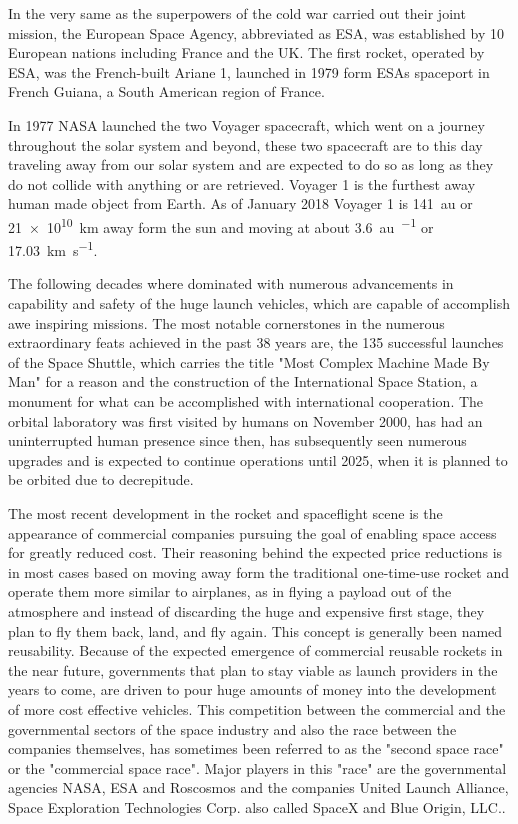 In the very same as the superpowers of the cold war carried out their joint mission, the European Space Agency, abbreviated as ESA, was established by 10 European nations including France and the UK. The first rocket, operated by ESA, was the French-built Ariane 1, launched in 1979 form ESAs spaceport in French Guiana, a South American region of France.

In 1977 NASA launched the two Voyager spacecraft, which went on a journey throughout the solar system and beyond, these two spacecraft are to this day traveling away from our solar system and are expected to do so as long as they do not collide with anything or are retrieved. Voyager 1 is the furthest away human made object from Earth. As of January 2018 Voyager 1 is \SI{141}{\astronomicalunit} or \SI{21e10}{\kilo\meter} away form the sun and moving at about \SI{3.6}{\astronomicalunit\per\year} or \SI{17.03}{\kilo\meter\per\second}.

The following decades where dominated with numerous advancements in capability and safety of the huge launch vehicles, which are capable of accomplish awe inspiring missions. The most notable cornerstones in the numerous extraordinary feats achieved in the past 38 years are, the 135 successful launches of the Space Shuttle, which carries the title "Most Complex Machine Made By Man" for a reason and the construction of the International Space Station, a monument for what can be accomplished with international cooperation. The orbital laboratory was first visited by humans on November 2000, has had an uninterrupted human presence since then, has subsequently seen numerous upgrades and is expected to continue operations until 2025, when it is planned to be orbited due to decrepitude.

The most recent development in the rocket and spaceflight scene is the appearance of commercial companies pursuing the goal of enabling space access for greatly reduced cost. Their reasoning behind the expected price reductions is in most cases based on moving away form the traditional one-time-use rocket and operate them more similar to airplanes, as in flying a payload out of the atmosphere and instead of discarding the huge and expensive first stage, they plan to fly them back, land, and fly again. This concept is generally been named reusability. Because of the expected emergence of commercial reusable rockets in the near future, governments that plan to stay viable as launch providers in the years to come, are driven to pour huge amounts of money into the development of more cost effective vehicles. This competition between the commercial and the governmental sectors of the space industry and also the race between the companies themselves, has sometimes been referred to as the "second space race" or the "commercial space race". Major players in this "race" are the governmental agencies NASA, ESA and Roscosmos and the companies United Launch Alliance, Space Exploration Technologies Corp. also called SpaceX and Blue Origin, LLC..


